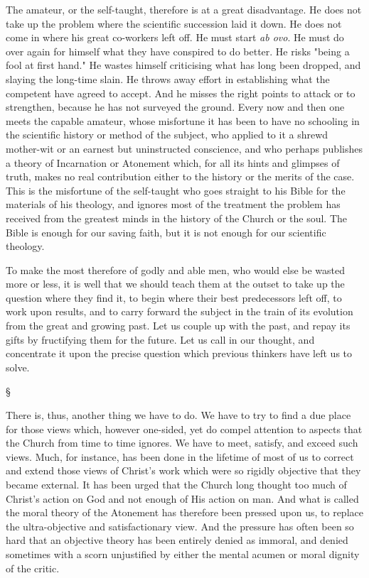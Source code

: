 \documentclass[12pt,letterpaper,oneside]{book}
\begin{document}
The amateur, or the self-taught, therefore is 
at a great disadvantage. He does not take up 
the problem where the scientific succession laid 
it down. He does not come in where his great 
co-workers left off. He must start \textit{ab ovo}. He 
must do over again for himself what they have 
conspired to do better. He risks "being a fool 
at first hand." He wastes himself criticising 
what has long been dropped, and slaying the 
long-time slain. He throws away effort in 
establishing what the competent have agreed 
to accept. And he misses the right points to 
attack or to strengthen, because he has not surveyed 
the ground. Every now and then one 
meets the capable amateur, whose misfortune 
it has been to have no schooling in the scientific 
history or method of the subject, who applied 
to it a shrewd mother-wit or an earnest but 
uninstructed conscience, and who perhaps publishes 
a theory of Incarnation or Atonement 
which, for all its hints and glimpses of truth, 
makes no real contribution either to the history 
or the merits of the case. This is the misfortune 
of the self-taught who goes straight 
to his Bible for the materials of his theology, 
and ignores most of the treatment the problem 
has received from the greatest minds in the 
history of the Church or the soul. The Bible 
is enough for our saving faith, but it is not 
enough for our scientific theology. 

To make the most therefore of godly and 
able men, who would else be wasted more or 
less, it is well that we should teach them at 
the outset to take up the question where they 
find it, to begin where their best predecessors 
left off, to work upon results, and to carry 
forward the subject in the train of its evolution 
from the great and growing past. Let us couple 
up with the past, and repay its gifts by fructifying 
them for the future. Let us call in our 
thought, and concentrate it upon the precise 
question which previous thinkers have left us 
to solve. 

\begin{center}
\S
\end{center}

There is, thus, another thing we have to do. 
We have to try to find a due place for those views 
which, however one-sided, yet do compel attention 
to aspects that the Church from time to time 
ignores. We have to meet, satisfy, and exceed 
such views. Much, for instance, has been done in 
the lifetime of most of us to correct and extend 
those views of Christ's work which were so 
rigidly objective that they became external. It 
has been urged that the Church long thought 
too much of Christ's action on God and not 
enough of His action on man. And what is 
called the moral theory of the Atonement has 
therefore been pressed upon us, to replace the 
ultra-objective and satisfactionary view. And 
the pressure has often been so hard that an objective 
theory has been entirely denied as immoral, 
and denied sometimes with a scorn unjustified 
by either the mental acumen or moral dignity 
of the critic. 
\end{document}

